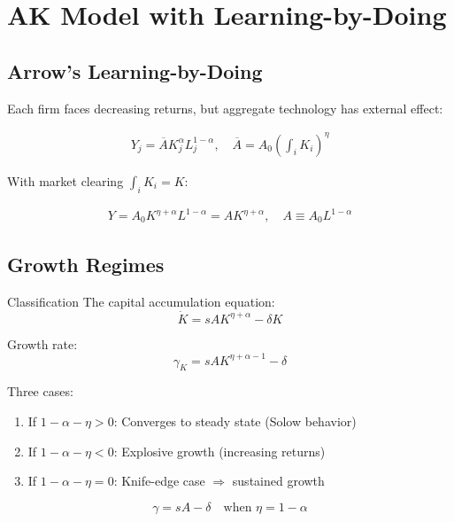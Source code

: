 \documentclass[a4paper,11pt]{article}
\begin{document}
\clearpage

\section{AK Model with Learning-by-Doing}

\subsection*{Arrow's Learning-by-Doing}
Each firm faces decreasing returns, but aggregate technology has external effect:

\begin{align*}
Y_j = \overline{A} K_j^\alpha L_j^{1-\alpha}, \quad \overline{A} = A_0 \left(\int_i K_i\right)^\eta
\tag{LbD Production}
\end{align*}

With market clearing $\int_i K_i = K$:

\begin{align*}
Y = A_0 K^{\eta+\alpha} L^{1-\alpha} = A K^{\eta+\alpha}, \quad A \equiv A_0 L^{1-\alpha}
\tag{Aggregate LbD}
\end{align*}

\medskip
\subsection*{Growth Regimes}

\begin{derivationbox}{Classification}
The capital accumulation equation:
\[
\dot{K} = sA K^{\eta+\alpha} - \delta K
\]

Growth rate:
\[
\gamma_K = sA K^{\eta+\alpha-1} - \delta
\]

Three cases:
\begin{enumerate}
    \item If $1 - \alpha - \eta > 0$: Converges to steady state (Solow behavior)
    \item If $1 - \alpha - \eta < 0$: Explosive growth (increasing returns)
    \item If $1 - \alpha - \eta = 0$: Knife-edge case $\Rightarrow$ sustained growth
\end{enumerate}
\end{derivationbox}

\begin{resultbox}
\[
\boxed{\gamma = sA - \delta \quad \text{when } \eta = 1 - \alpha}
\tag{Solow-AK Growth}
\]
\end{resultbox}
\end{document}
